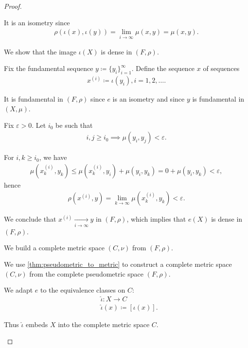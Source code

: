 \begin{proof}
\begin{defenum}
    It is an isometry since
    \begin{align*}
      \rho(\iota(x),\iota(y)) = \lim_{i \to \infty} \mu(x, y) = \mu(x, y).
    \end{align*}

    \item\label{thm:metric_space_completion_existence/part_d} We show that the image $\iota(X)$ is dense in $(F, \rho)$.

    Fix the fundamental sequence $y \coloneqq \{ y_i \}_{i=1}^\infty$. Define the sequence $x$ of sequences
    \begin{align*}
      x^{(i)} \coloneqq \iota(y_i), i = 1, 2, \ldots.
    \end{align*}

    It is fundamental in $(F, \rho)$ since $e$ is an isometry and since $y$ is fundamental in $(X, \mu)$.

    Fix $\varepsilon > 0$. Let $i_0$ be such that
    \begin{align*}
      i, j \geq i_0 \implies \mu(y_i, y_j) < \varepsilon.
    \end{align*}

    For $i, k \geq i_0$, we have
    \begin{align*}
      \mu(x_k^{(i)}, y_k)
      \leq
      \mu(x_k^{(i)}, y_i) + \mu(y_i, y_k)
      =
      0 + \mu(y_i, y_k)
      <
      \varepsilon,
    \end{align*}
    hence
    \begin{align*}
      \rho(x^{(i)}, y) = \lim_{k \to \infty} \mu(x_k^{(i)}, y_k) < \varepsilon.
    \end{align*}

    We conclude that $x^{(i)} \xrightarrow[i \to \infty]{} y$ in $(F, \rho)$, which implies that $e(X)$ is dense in $(F, \rho)$.

    \item\label{thm:metric_space_completion_existence/part_e} We build a complete metric space $(C, \nu)$ from $(F, \rho)$.

    We use \cref{thm:pseudometric_to_metric} to construct a complete metric space $(C, \nu)$ from the complete pseudometric space $(F, \rho)$.

    We adapt $e$ to the equivalence classes on $C$:
    \begin{align*}
      &\hat\iota: X \to C \\
      &\hat\iota(x) \coloneqq [\iota(x)].
    \end{align*}

    Thus $\hat\iota$ embeds $X$ into the complete metric space $C$.
  \end{defenum}
\end{proof}

